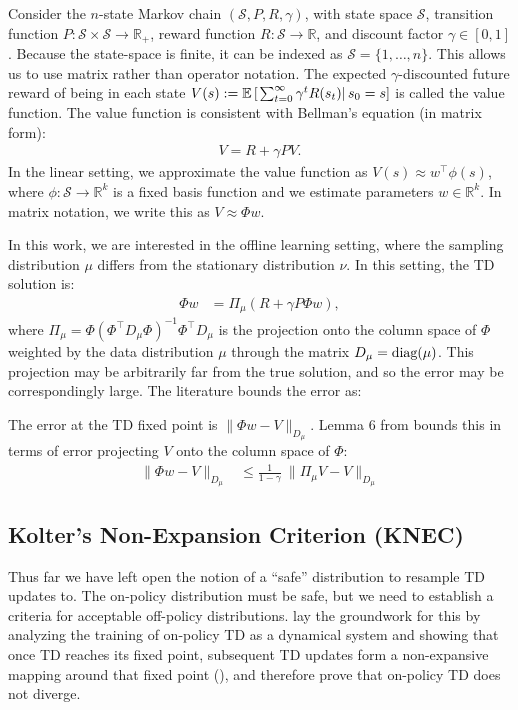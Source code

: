 Consider the $n$-state Markov chain $(\mathcal S, P, R, \gamma)$, with state space $\mathcal S$, transition function $P : \mathcal{S} \times \mathcal{S} \to \mathbb{R}_+$, reward function $R : \mathcal S \to \mathbb R$, and discount factor $\gamma \in [0, 1]$.
Because the state-space is finite, it can be indexed as $\mathcal{S} = \{1, \ldots, n\}$.
This allows us to use matrix rather than operator notation.
The expected $\gamma$-discounted future reward of being in each state $V(s) := \mathbb{E} \left[\left.\sum_{t=0}^\infty \gamma^t R(s_t) \right| s_0 = s \right]$ is called the value function.
The value function is consistent with Bellman's equation (in matrix form):
\begin{align}
  V = R + \gamma P V .
\end{align}
In the linear setting, we approximate the value function as $V(s) \approx w^\top \phi(s)$, where $\phi : \mathcal S \to \mathbb R^{k}$ is a fixed basis function and we estimate parameters $w \in \mathbb R^k$. In matrix notation, we write this as $V \approx \Phi w$.

In this work, we are interested in the offline learning setting, where the sampling distribution $\mu$ differs from the stationary distribution $\nu$.
In this setting, the TD solution is:
\begin{align}
  \Phi w & = \Pi_{\mu} (R + \gamma P \Phi w) ,
\end{align}
where $\Pi_\mu = \Phi(\Phi^\top D_{\mu} \Phi)^{-1}\Phi^\top D_{\mu}$ is the projection onto the column space of $\Phi$ weighted by the data distribution $\mu$ through the matrix $D_{\mu} = \text{diag}(\mu)$. This projection may be arbitrarily far from the true solution, and so the error may be correspondingly large. The literature bounds the error as:
\begin{theorem}
  The error at the TD fixed point is $\|\Phi w - V \|_{D_\mu}$. Lemma 6 from \cite{tsitsiklis1996analysis} bounds this in terms of error projecting $V$ onto the column space of $\Phi$:
  \begin{align}
    \|\Phi w - V \|_{D_\mu} & \leq \frac{1}{1-\gamma} ~ \| \Pi_{\mu} V - V \|_{D_\mu}
  \end{align} \label{thm:boundTDError}
\end{theorem}

\subsection{Kolter's Non-Expansion Criterion (KNEC)}
Thus far we have left open the notion of a ``safe'' distribution to resample TD updates to. The on-policy distribution must be safe, but we need to establish a criteria for acceptable off-policy distributions. \citeauthor{tsitsiklis1996analysis} lay the groundwork for this by analyzing the training of on-policy TD as a dynamical system and showing that once TD reaches its fixed point, subsequent TD updates form a non-expansive mapping around that fixed point (\citeyear[lemma 4]{tsitsiklis1996analysis}), and therefore prove that on-policy TD does not diverge.

